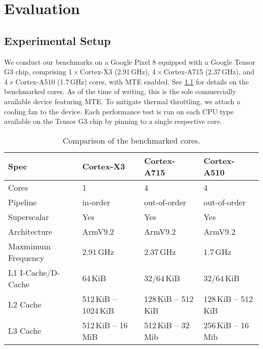 \chapter{Evaluation}
\label{ch:eval}


\section{Experimental Setup}\label{sec:experimental-setup}

We conduct our benchmarks on a Google Pixel 8 equipped with a Google Tensor G3 chip, comprising 1\,$\times$\,Cortex-X3 (2.91\,GHz), 4\,$\times$\,Cortex-A715 (2.37\,GHz), and 4\,$\times$\,Cortex-A510 (1.7\,GHz) cores, with \ac{MTE} enabled.
See \cref{tab:cores-comparison} for details on the benchmarked cores.
As of the time of writing, this is the sole commercially available device featuring \ac{MTE}.
To mitigate thermal throttling, we attach a cooling fan to the device.
Each performance test is run on each CPU type available on the Tensor G3 chip by pinning to a single respective core.


\begin{table}[ht]
    \centering
    \small
    \begin{tabular}{l || l | l | l}
        \textbf{Spec}      & \textbf{Cortex-X3}    & \textbf{Cortex-A715} & \textbf{Cortex-A510} \\
        \hline
        Cores              & 1                     & 4                    & 4                    \\
        Pipeline           & in-order              & out-of-order         & out-of-order         \\
        Superscalar        & Yes                   & Yes                  & Yes                  \\
        Architecture       & ArmV9.2               & ArmV9.2              & ArmV9.2              \\
        Maxmimum Frequency & 2.91\,GHz             & 2.37\,GHz            & 1.7\,GHz             \\
        L1 I-Cache/D-Cache & 64\,KiB               & $32/64$\,KiB         & $32/64$\,KiB         \\
        L2 Cache           & 512\,KiB -- 1024\,KiB & 128\,KiB -- 512\,KiB & 128\,KiB -- 512\,KiB \\
        L3 Cache           & 512\,KiB -- 16\,MiB   & 512\,KiB -- 32\,Mib  & 256\,KiB -- 16\,Mib  \\
    \end{tabular}
    \caption{Comparison of the benchmarked cores.}
    \label{tab:cores-comparison}
\end{table}


